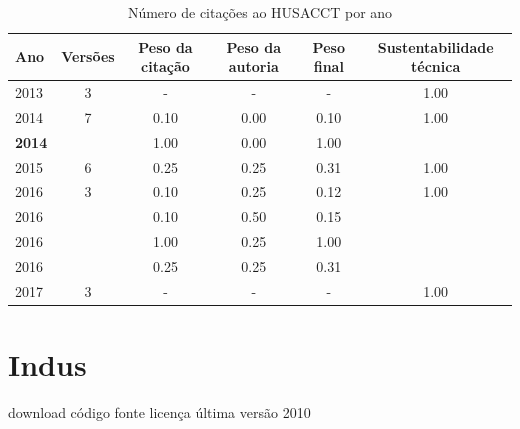 \begin{table}[H]
\caption{Número de citações ao HUSACCT  por ano}
\centering
\begin{tabular}{| l | c | c | c | c | c |}
  \hline
  Ano & Versões & Peso da citação & Peso da autoria & Peso final & Sustentabilidade técnica \\
  \hline
        2013 & 3 & - & - & -
        &
          {\color{blue} 1.00}
        \\
\hline
            2014
          &
          7
          &
          0.10
          &
          0.00
          &
          0.10
          &
            {\color{blue} 1.00}
          \\
            {\bf 2014}
          &
          
          &
          1.00
          &
          0.00
          &
          1.00
          &
          \\
\hline
            2015
          &
          6
          &
          0.25
          &
          0.25
          &
          0.31
          &
            {\color{blue} 1.00}
          \\
\hline
            2016
          &
          3
          &
          0.10
          &
          0.25
          &
          0.12
          &
            {\color{blue} 1.00}
          \\
            2016
          &
          
          &
          0.10
          &
          0.50
          &
          0.15
          &
          \\
            2016
          &
          
          &
          1.00
          &
          0.25
          &
          1.00
          &
          \\
            2016
          &
          
          &
          0.25
          &
          0.25
          &
          0.31
          &
          \\
\hline
        2017 & 3 & - & - & -
        &
          {\color{blue} 1.00}
        \\
\hline
\end{tabular}
\end{table}



\section{Indus}
\checkmark download
\checkmark código fonte
\checkmark licença
\checkmark última versão 2010


